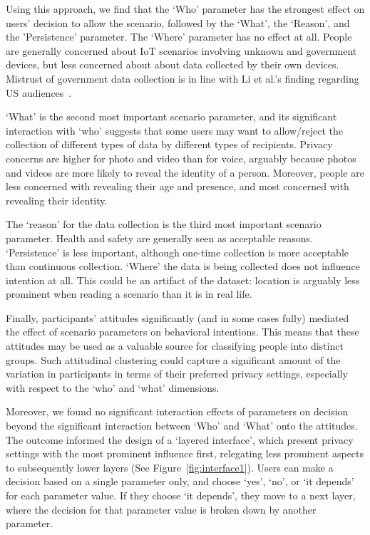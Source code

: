 Using this approach, we find that the `Who' parameter has the strongest effect on users' decision to allow the scenario, followed by the `What', the `Reason', and the 'Persistence' parameter. The `Where' parameter has no effect at all. People are generally concerned about IoT scenarios involving unknown and government devices, but less concerned about about data collected by their own devices. Mistrust of government data collection is in line with Li et al.'s finding regarding US audiences~\cite{li2017cross}.

`What' is the second most important scenario parameter, and its significant interaction with `who' suggests that some users may want to allow/reject the collection of different types of data by different types of recipients. Privacy concerns are higher for photo and video than for voice, arguably because photos and videos are more likely to reveal the identity of a person. Moreover, people are less concerned with revealing their age and presence, and most concerned with revealing their identity.

The `reason' for the data collection is the third most important scenario parameter. Health and safety are generally seen as acceptable reasons. `Persistence' is less important, although one-time collection is more acceptable than continuous collection. `Where' the data is being collected does not influence intention at all. This could be an artifact of the dataset: location is arguably less prominent when reading a scenario than it is in real life.

Finally, participants' attitudes significantly (and in some cases fully) mediated the effect of scenario parameters on behavioral intentions. This means that these attitudes may be used as a valuable source for classifying people into distinct groups. Such attitudinal clustering could capture a significant amount of the variation in participants in terms of their preferred privacy settings, especially with respect to the `who' and `what' dimensions.

Moreover, we found no significant interaction effects of parameters on decision beyond the significant interaction between `Who' and `What' onto the attitudes. The outcome informed the design of a `layered interface', which present privacy settings with the most prominent influence first, relegating less prominent aspects to subsequently lower layers (See Figure~\ref{fig:interface1}). Users can make a decision based on a single parameter only, and choose `yes', `no', or `it depends' for each parameter value. If they choose `it depends', they move to a next layer, where the decision for that parameter value is broken down by another parameter.

